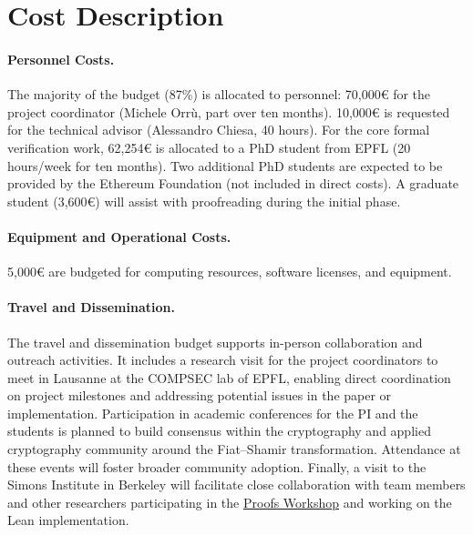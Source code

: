 \documentclass{article}
\begin{document}
\section{Cost Description}


\paragraph{Personnel Costs.} The majority of the budget (87\%) is allocated to personnel: 70,000\euro{} for the project coordinator (Michele Orrù, part over ten months). 10,000\euro{} is requested for the technical advisor (Alessandro Chiesa, 40 hours). For the core formal verification work, 62,254\euro{} is allocated to a PhD student from EPFL (20 hours/week for ten months). Two additional PhD students are expected to be provided by the Ethereum Foundation (not included in direct costs). A graduate student (3,600\euro{}) will assist with proofreading during the initial phase.

\paragraph{Equipment and Operational Costs.}
5,000\euro{} are budgeted for computing resources, software licenses, and equipment.

\paragraph{Travel and Dissemination.} The travel and dissemination budget supports in-person collaboration and outreach activities. It includes a research visit for the project coordinators to meet in Lausanne at the COMPSEC lab of EPFL, enabling direct coordination on project milestones and addressing potential issues in the paper or implementation. Participation in academic conferences for the PI and the students is planned to build consensus within the cryptography and applied cryptography community around the Fiat--Shamir transformation. Attendance at these events will foster broader community adoption. Finally, a visit to the Simons Institute in Berkeley will facilitate close collaboration with team members and other researchers participating in the \href{https://simons.berkeley.edu/workshops/cryptography-10-years-later-obfuscation-proof-systems-secure-computation-boot-campx}{Proofs Workshop} and working on the Lean implementation.
\end{document}
